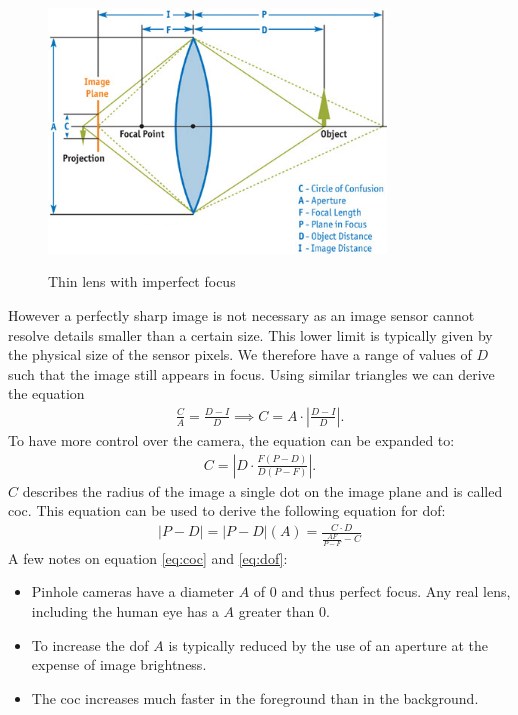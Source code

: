 \begin{figure}[h]
    \centering
    \includegraphics[width=0.8\textwidth]{images/fig23-02_1.png}
    \caption{Thin lens with imperfect focus}
    \label{fig:coc-thin-lens}
    \cite{Demers.2005}
\end{figure}
However a perfectly sharp image is not necessary as an image sensor cannot resolve details smaller than a certain size.
This lower limit is typically given by the physical size of the sensor pixels.
We therefore have a range of values of $D$ such that the image still appears in focus.
Using similar triangles we can derive the equation
\begin{align}
    \frac{C}{A} = \frac{D-I}{D} \implies C = A \cdot |\frac{D-I}{D}|.
    \label{eq:coc}
\end{align}
To have more control over the camera, the equation can be expanded to:
\begin{align}
    C = | D \cdot \frac{F(P-D)}{D(P-F)}|.
    \label{eq:coc-expanded}
\end{align}
$C$ describes the radius of the image a single dot on the image plane and is called \gls{coc}.
This equation can be used to derive the following equation for \gls{dof}:
\begin{align}
    |P-D| = |P-D|(A) = \frac{C \cdot D}{\frac{A F}{P-F} - C}
    \label{eq:dof}
\end{align}
A few notes on equation \ref{eq:coc} and \ref{eq:dof}:
\begin{itemize}
    \item Pinhole cameras have a diameter $A$ of 0 and thus perfect focus. Any real lens, including the human eye has a $A$ greater than 0.
    \item To increase the \gls{dof} $A$ is typically reduced by the use of an aperture at the expense of image brightness.
    \item The \gls{coc} increases much faster in the foreground than in the background.
\end{itemize}

